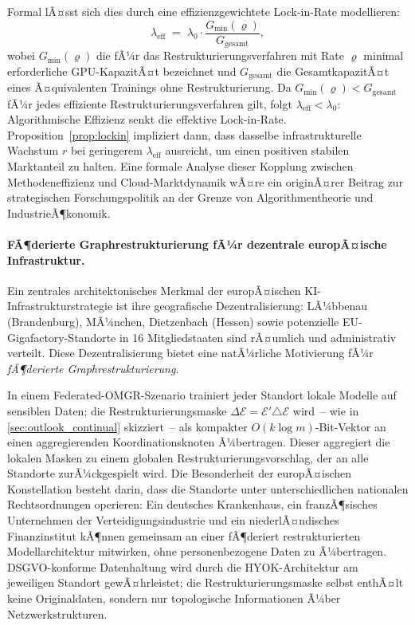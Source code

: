 ﻿\documentclass[12pt, a4paper, openany]{report}
\newcommand{\calE}{\mathcal{E}}
\begin{document}
Formal lÃ¤sst sich dies durch eine effizienzgewichtete Lock-in-Rate
modellieren:
\[
  \lambda_{\mathrm{eff}}
  \;=\; \lambda_0 \cdot \frac{G_{\min}(\varrho)}{G_{\mathrm{gesamt}}},
\]
wobei $G_{\min}(\varrho)$ die fÃ¼r das Restrukturierungsverfahren mit
Rate $\varrho$ minimal erforderliche GPU-KapazitÃ¤t bezeichnet und
$G_{\mathrm{gesamt}}$ die GesamtkapazitÃ¤t eines Ã¤quivalenten Trainings
ohne Restrukturierung.  Da $G_{\min}(\varrho) < G_{\mathrm{gesamt}}$
fÃ¼r jedes effiziente Restrukturierungsverfahren gilt, folgt
$\lambda_{\mathrm{eff}} < \lambda_0$: Algorithmische Effizienz senkt
die effektive Lock-in-Rate.  Proposition~\ref{prop:lockin} impliziert
dann, dass dasselbe infrastrukturelle Wachstum $r$ bei geringerem
$\lambda_{\mathrm{eff}}$ ausreicht, um einen positiven stabilen
Marktanteil zu halten.  Eine formale Analyse dieser Kopplung zwischen
Methodeneffizienz und Cloud-Marktdynamik wÃ¤re ein originÃ¤rer Beitrag
zur strategischen Forschungspolitik an der Grenze von
Algorithmentheorie und IndustrieÃ¶konomik.

\paragraph{FÃ¶derierte Graphrestrukturierung fÃ¼r dezentrale
  europÃ¤ische Infrastruktur.}
Ein zentrales architektonisches Merkmal der europÃ¤ischen
KI-Infrastrukturstrategie ist ihre geografische Dezentralisierung:
LÃ¼bbenau (Brandenburg), MÃ¼nchen, Dietzenbach (Hessen) sowie potenzielle
EU-Gigafactory-Standorte in 16 Mitgliedstaaten sind rÃ¤umlich und
administrativ verteilt.  Diese Dezentralisierung bietet eine natÃ¼rliche
Motivierung fÃ¼r \emph{fÃ¶derierte Graphrestrukturierung}.

In einem Federated-OMGR-Szenario trainiert jeder Standort lokale
Modelle auf sensiblen Daten; die Restrukturierungsmaske
$\Delta\calE = \calE' \triangle \calE$ wird~-- wie in
\cref{sec:outlook_continual} skizziert~-- als kompakter
$O(k \log m)$-Bit-Vektor an einen aggregierenden Koordinationsknoten
Ã¼bertragen.  Dieser aggregiert die lokalen Masken zu einem globalen
Restrukturierungsvorschlag, der an alle Standorte zurÃ¼ckgespielt wird.
Die Besonderheit der europÃ¤ischen Konstellation besteht darin, dass
die Standorte unter unterschiedlichen nationalen Rechtsordnungen
operieren: Ein deutsches Krankenhaus, ein franzÃ¶sisches Unternehmen der
Verteidigungsindustrie und ein niederlÃ¤ndisches Finanzinstitut kÃ¶nnen
gemeinsam an einer fÃ¶deriert restrukturierten Modellarchitektur
mitwirken, ohne personenbezogene Daten zu Ã¼bertragen.
DSGVO-konforme Datenhaltung wird durch die HYOK-Architektur am
jeweiligen Standort gewÃ¤hrleistet; die Restrukturierungsmaske selbst
enthÃ¤lt keine Originaldaten, sondern nur topologische Informationen
Ã¼ber Netzwerkstrukturen.
\end{document}
